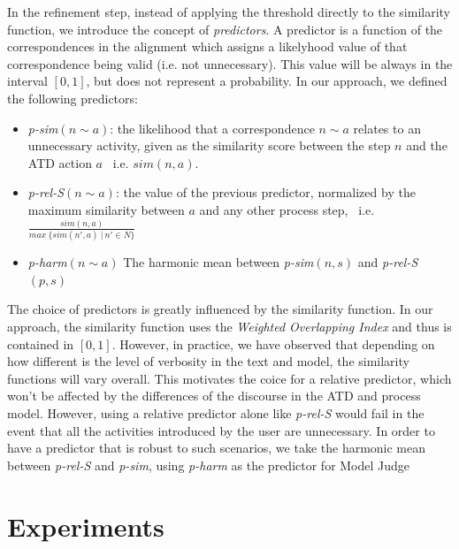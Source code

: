 In the refinement step, instead of applying the threshold directly to the
similarity function, we introduce the concept of \emph{predictors}. A predictor
is a function of the correspondences in the alignment which assigns a likelyhood
value of that correspondence being valid (i.e. not unnecessary). This value will
be always in the interval $[0,1]$, but does not represent a probability. In our
approach, we defined the following predictors:

\begin{itemize}
	\item \textit{p-sim}$(n \sim a)$: the likelihood that a correspondence $n \sim a$
    relates to an unnecessary activity, given as the similarity score between
    the step $n$ and the ATD action $a$~ i.e. $sim(n,a)$.
    
	\item \textit{p-rel-S}$(n \sim a)$: the value of the previous predictor,
    normalized by the maximum similarity between $a$ and any other process step,
    ~i.e. \\ $\frac{sim(n,a)}{max~\{sim(n', a)~|~n' \in N\}}$
    
  \item \textit{p-harm}$(n \sim a)$ The harmonic mean between \textit{p-sim}$(n,
    s)$ and \textit{p-rel-S}$(p,s)$
\end{itemize}


The choice of predictors is greatly influenced by the similarity function. In
our approach, the similarity function uses the \emph{Weighted Overlapping Index}
and thus is contained in $[0,1]$. However, in practice, we have observed that
depending on how different is the level of verbosity in the text and model, the
similarity functions will vary overall. This motivates the coice for a relative
predictor, which won't be affected by the differences of the discourse in the ATD and
process model. However, using a relative predictor alone like \textit{p-rel-S} would
fail in the event that all the activities introduced by the user are
unnecessary. In order to have a predictor that is robust to such scenarios, we
take the harmonic mean between \textit{p-rel-S} and \textit{p-sim}, using
\textit{p-harm} as the predictor for Model Judge


 



\section{Experiments}
\label{sec:modeljudge_results}

